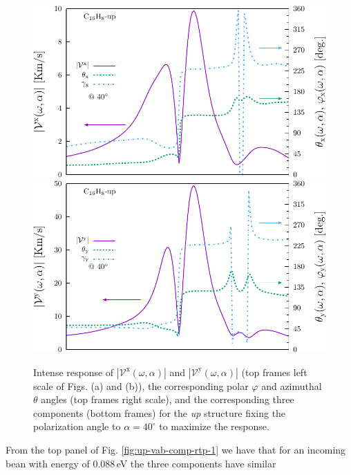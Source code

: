 \documentclass[prb,11pt,tightenlines,twocolumn,aps]{revtex4-1}
\begin{document}
\begin{figure}[t]
    \centering
    \includegraphics[width=\linewidth]{upplots/up-vxb-rtp-m2}
    \\
    \includegraphics[width=\linewidth]{upplots/up-vyb-rtp-m2}
    
    \caption{Intense response of
    $|\mathcal{V}^{\mathrm{x}}(\omega,\alpha)|$ and
    $|\mathcal{V}^{\mathrm{y}}(\omega,\alpha)|$ (top frames left scale of Figs.
    (a) and (b)), the corresponding polar $\varphi$ and azimuthal $\theta$
    angles (top frames right scale), and the corresponding three components
    (bottom frames) for the \emph{up} structure fixing the polarization angle to
    $\alpha=40^{\circ}$ to maximize the response.}

    \label{fig:up-vab-comp-rtp-2}
\end{figure}
From the top panel of Fig. \ref{fig:up-vab-comp-rtp-1} we have that for an
incoming bean with energy of 0.088\,eV the three components have similar
\end{document}
